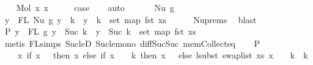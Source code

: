 \begin{isabellebody}
\isanewline
\ \ \isamarkupfalse%
\ {\isacharparenleft}{\kern0pt}Mol\ x{}\ x{}{\isacharparenright}{\kern0pt}\isanewline
\ \ \isamarkupfalse%
\ \isamarkupfalse%
\ {\isacharquery}{\kern0pt}case\isanewline
\ \ \isamarkupfalse%
\ auto\isanewline
\ \ \isamarkupfalse%
\isanewline
{}\isamarkupfalse%
\isanewline
\ \ \isamarkupfalse%
\ {\isacharparenleft}{\kern0pt}Nu\ g{\isacharprime}{\kern0pt}{\isacharparenright}{\kern0pt}\isanewline
\ \ \isamarkupfalse%
\ {\isachardoublequoteopen}{\isasymforall}y\ {\isasymin}\ FL\ {\isacharparenleft}{\kern0pt}Nu\ g{\isacharprime}{\kern0pt}{\isacharparenright}{\kern0pt}{\isachardot}{\kern0pt}\ y\ {\isachargreater}{\kern0pt}{\isacharequal}{\kern0pt}\ k\ {\isacharminus}{\kern0pt}{\isacharminus}{\kern0pt}{\isachargreater}{\kern0pt}\ y\ {\isacharminus}{\kern0pt}\ k\ {\isasymin}\ set\ {\isacharparenleft}{\kern0pt}map\ fst\ xs{\isacharparenright}{\kern0pt}{\isachardoublequoteclose}\isanewline
\ \ \ \ \isamarkupfalse%
\ Nu{\isachardot}{\kern0pt}prems{\isacharparenleft}{\kern0pt}{}{\isacharparenright}{\kern0pt}\ \isamarkupfalse%
\ blast\isanewline
\ \ \isamarkupfalse%
\ \isamarkupfalse%
\ P{}{\isacharcolon}{\kern0pt}\ {\isachardoublequoteopen}{\isasymforall}y\ {\isasymin}\ FL\ g{\isacharprime}{\kern0pt}{\isachardot}{\kern0pt}\ y\ {\isachargreater}{\kern0pt}{\isacharequal}{\kern0pt}\ Suc\ k\ {\isacharminus}{\kern0pt}{\isacharminus}{\kern0pt}{\isachargreater}{\kern0pt}\ y\ {\isacharminus}{\kern0pt}\ {\isacharparenleft}{\kern0pt}Suc\ k{\isacharparenright}{\kern0pt}\ {\isasymin}\ set\ {\isacharparenleft}{\kern0pt}map\ fst\ xs{\isacharparenright}{\kern0pt}{\isachardoublequoteclose}\isanewline
\ \ \ \ \isamarkupfalse%
\ {\isacharparenleft}{\kern0pt}metis\ FL{\isachardot}{\kern0pt}simps{\isacharparenleft}{\kern0pt}{}{\isacharparenright}{\kern0pt}\ Suc{\isacharunderscore}{\kern0pt}le{\isacharunderscore}{\kern0pt}D\ Suc{\isacharunderscore}{\kern0pt}le{\isacharunderscore}{\kern0pt}mono\ diff{\isacharunderscore}{\kern0pt}Suc{\isacharunderscore}{\kern0pt}Suc\ mem{\isacharunderscore}{\kern0pt}Collect{\isacharunderscore}{\kern0pt}eq{\isacharparenright}{\kern0pt}\isanewline
\isanewline
\ \ \isamarkupfalse%
\ P{}{\isacharcolon}{\kern0pt}\isanewline
\ \ \ \ {\isachardoublequoteopen}{\isacharparenleft}{\kern0pt}{\isasymlambda}x{\isachardot}{\kern0pt}\ if\ x\ {\isacharequal}{\kern0pt}\ {}\ then\ x\ else\ {\isacharparenleft}{\kern0pt}if\ x\ {\isacharminus}{\kern0pt}\ {}\ {\isacharless}{\kern0pt}\ k\ then\ x\ {\isacharminus}{\kern0pt}\ {}\ else\ lsubst\ {\isacharparenleft}{\kern0pt}swap{\isacharunderscore}{\kern0pt}list\ xs{\isacharparenright}{\kern0pt}\ {\isacharparenleft}{\kern0pt}x\ {\isacharminus}{\kern0pt}\ {}\ {\isacharminus}{\kern0pt}\ k{\isacharparenright}{\kern0pt}\ {\isacharplus}{\kern0pt}\ k{\isacharparenright}{\kern0pt}\ {\isacharplus}{\kern0pt}\ {}{\isacharparenright}{\kern0pt}\ {\isacharequal}{\kern0pt}\isanewline

\end{isabellebody}
